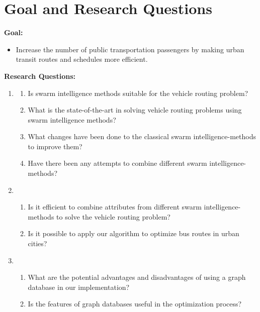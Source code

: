 \section{Goal and Research Questions}
\textbf{Goal:}
\begin{itemize}
\item \label{itm:goal} Increase the number of public transportation passengers by making urban transit routes and schedules more efficient.
\end{itemize}
\textbf{Research Questions:}
\begin{enumerate}[label=\textbf{\arabic*})]
\item \label{itm:1}
    \begin{enumerate}
    \item \label{itm:1a} Is swarm intelligence methods suitable for the vehicle routing problem?
    \item \label{itm:1b} What is the state-of-the-art in solving vehicle routing problems using swarm intelligence methods?
    \item \label{itm:1c} What changes have been done to the classical swarm intelligence-methods to improve them?
    \item \label{itm:1d} Have there been any attempts to combine different swarm intelligence-methods?
	\end{enumerate}
\item
    \begin{enumerate}
    \item \label{itm:2a} Is it efficient to combine attributes from different swarm intelligence-methods to solve the vehicle routing problem?
    \item \label{itm:2b} Is it possible to apply our algorithm to optimize bus routes in urban cities?
    \end{enumerate}

\item
	\begin{enumerate}
	\item \label{itm:3a} What are the potential advantages and disadvantages of using a graph database in our implementation?
	\item \label{itm:3b} Is the features of graph databases useful in the optimization process? 
    \end{enumerate}
\end{enumerate}